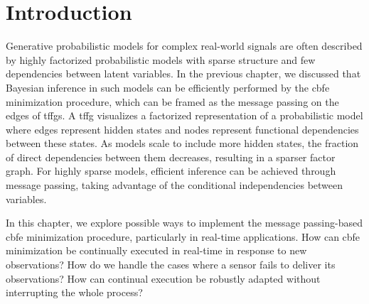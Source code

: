 \section{Introduction}\label{chapter-03:section:introduction}

Generative probabilistic models for complex real-world signals are often described by highly
factorized probabilistic models with sparse structure and few dependencies between latent
variables.
In the previous chapter, we discussed that Bayesian inference in such models can be
efficiently performed by the \ac{cbfe} minimization procedure, which can be framed as the message
passing on the edges of \acp{tffg}.
A \ac{tffg} visualizes a factorized representation of a probabilistic model where edges
represent hidden states and nodes represent functional dependencies between these
states.
As models scale to include more hidden states, the fraction of direct dependencies between
them decreases, resulting in a sparser factor graph.
For highly sparse models, efficient inference can be achieved through message passing, taking
advantage of the conditional independencies between variables.

In this chapter, we explore possible ways to implement the message passing-based \ac{cbfe}
minimization procedure, particularly in real-time applications.
How can \ac{cbfe} minimization be continually executed in real-time in response to new
observations?
How do we handle the cases where a sensor fails to deliver its observations?
How can continual execution be robustly adapted without interrupting the whole process?

